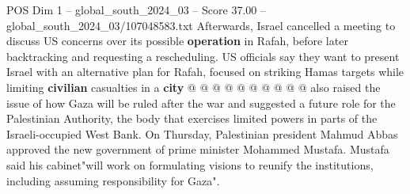 \begin{textsample}{POS Dim 1 – global\_south\_2024\_03 – Score 37.00 – global\_south\_2024\_03/107048583.txt}
Afterwards, Israel cancelled a meeting to discuss US concerns over its possible \textbf{operation} in Rafah, before later backtracking and requesting a rescheduling.
US officials say they want to present Israel with an alternative plan for Rafah, focused on striking Hamas targets while limiting \textbf{civilian} casualties in a \textbf{city} @ @ @ @ @ @ @ @ @ @ also raised the issue of how Gaza will be ruled after the war and suggested a future role for the Palestinian Authority, the body that exercises limited powers in parts of the Israeli-occupied West Bank.
On Thursday, Palestinian president Mahmud Abbas approved the new government of prime minister Mohammed Mustafa.
Mustafa said his cabinet"will work on formulating visions to reunify the institutions, including assuming responsibility for Gaza".

\end{textsample}

